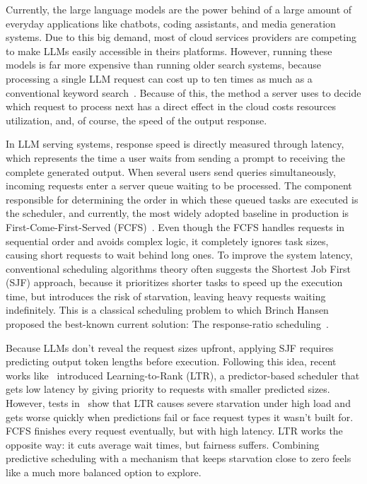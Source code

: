 Currently, the large language models are the power behind of a large amount of everyday applications like chatbots, coding assistants, and media generation systems. Due to this big demand, most of cloud services providers are competing to make LLMs easily accessible in theirs platforms. However, running these models is far more expensive than running older search systems, because processing a single LLM request can cost up to ten times as much as a conventional keyword search~\cite{kumar2024latency}. Because of this, the method a server uses to decide which request to process next has a direct effect in the cloud costs resources utilization, and, of course, the speed of the output response.

In LLM serving systems, response speed is directly measured through latency, which represents the time a user waits from sending a prompt to receiving the complete generated output. When several users send queries simultaneously, incoming requests enter a server queue waiting to be processed. The component responsible for determining the order in which these queued tasks are executed is the scheduler, and currently, the most widely adopted baseline in production is First-Come-First-Served (FCFS)~\cite{yu2022orca}. Even though the FCFS handles requests in sequential order and avoids complex logic, it completely ignores task sizes, causing short requests to wait behind long ones. To improve the system latency, conventional scheduling algorithms theory often suggests the Shortest Job First (SJF) approach, because it prioritizes shorter tasks to speed up the execution time, but introduces the risk of starvation, leaving heavy requests waiting indefinitely. This is a classical scheduling problem to which Brinch Hansen proposed the best-known current solution: The response-ratio scheduling~\cite{hansen1973os}.

Because LLMs don't reveal the request sizes upfront, applying SJF requires predicting output token lengths before execution. Following this idea, recent works like~\cite{fu2024ltr} introduced Learning-to-Rank (LTR), a predictor-based scheduler that gets low latency by giving priority to requests with smaller predicted sizes. However, tests in~\cite{kumar2024latency} show that LTR causes severe starvation under high load and gets worse quickly when predictions fail or face request types it wasn't built for. FCFS finishes every request eventually, but with high latency. LTR works the opposite way: it cuts average wait times, but fairness suffers. Combining predictive scheduling with a mechanism that keeps starvation close to zero feels like a much more balanced option to explore.

